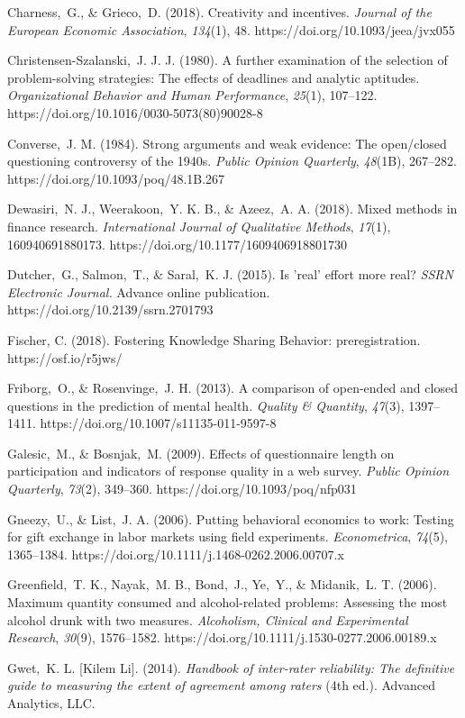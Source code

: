 \documentclass{article}
\begin{document}
Charness, G., \& Grieco, D. (2018). Creativity and incentives. \emph{Journal of the European Economic Association}, \emph{134}(1), 48. https://doi.org/10.1093/jeea/jvx055

Christensen-Szalanski, J. J. J. (1980). A further examination of the selection of problem-solving strategies: The effects of deadlines and analytic aptitudes. \emph{Organizational Behavior and Human Performance}, \emph{25}(1), 107--122. https://doi.org/10.1016/0030-5073(80)90028-8

Converse, J. M. (1984). Strong arguments and weak evidence: The open/closed questioning controversy of the 1940s. \emph{Public Opinion Quarterly}, \emph{48}(1B), 267--282. https://doi.org/10.1093/poq/48.1B.267

Dewasiri, N. J., Weerakoon, Y. K. B., \& Azeez, A. A. (2018). Mixed methods in finance research. \emph{International Journal of Qualitative Methods}, \emph{17}(1), 160940691880173. https://doi.org/10.1177/1609406918801730

Dutcher, G., Salmon, T., \& Saral, K. J. (2015). Is 'real' effort more real? \emph{SSRN Electronic Journal. }Advance online publication. https://doi.org/10.2139/ssrn.2701793

Fischer, C. (2018). Fostering Knowledge Sharing Behavior: preregistration. https://osf.io/r5jws/

Friborg, O., \& Rosenvinge, J. H. (2013). A comparison of open-ended and closed questions in the prediction of mental health. \emph{Quality \& Quantity}, \emph{47}(3), 1397--1411. https://doi.org/10.1007/s11135-011-9597-8

Galesic, M., \& Bosnjak, M. (2009). Effects of questionnaire length on participation and indicators of response quality in a web survey. \emph{Public Opinion Quarterly}, \emph{73}(2), 349--360. https://doi.org/10.1093/poq/nfp031

Gneezy, U., \& List, J. A. (2006). Putting behavioral economics to work: Testing for gift exchange in labor markets using field experiments. \emph{Econometrica}, \emph{74}(5), 1365--1384. https://doi.org/10.1111/j.1468-0262.2006.00707.x

Greenfield, T. K., Nayak, M. B., Bond, J., Ye, Y., \& Midanik, L. T. (2006). Maximum quantity consumed and alcohol-related problems: Assessing the most alcohol drunk with two measures. \emph{Alcoholism, Clinical and Experimental Research}, \emph{30}(9), 1576--1582. https://doi.org/10.1111/j.1530-0277.2006.00189.x

Gwet, K. L. [Kilem Li]. (2014). \emph{Handbook of inter-rater reliability: The definitive guide to measuring the extent of agreement among raters} (4th ed.). Advanced Analytics, LLC. 
\end{document}
